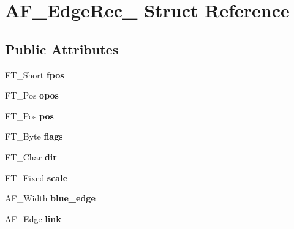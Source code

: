 \hypertarget{struct_a_f___edge_rec__}{}\section{A\+F\+\_\+\+Edge\+Rec\+\_\+ Struct Reference}
\label{struct_a_f___edge_rec__}
\subsection*{Public Attributes}
\begin{DoxyCompactItemize}
\item 
\mbox{\label{struct_a_f___edge_rec___a7890171d1e3f1fbd44b2ab7196594d46}} 
F\+T\+\_\+\+Short {\bfseries fpos}
\item 
\mbox{\label{struct_a_f___edge_rec___a8c44f0a3e4aa3254b0dd5777ad3a997b}} 
F\+T\+\_\+\+Pos {\bfseries opos}
\item 
\mbox{\label{struct_a_f___edge_rec___a2b8e96f147dcff3bcf0bcdfff6924256}} 
F\+T\+\_\+\+Pos {\bfseries pos}
\item 
\mbox{\label{struct_a_f___edge_rec___aad7515038f97e092e10ff4e84bab74ca}} 
F\+T\+\_\+\+Byte {\bfseries flags}
\item 
\mbox{\label{struct_a_f___edge_rec___a04e72c31f57dd4317b95445cf649c1db}} 
F\+T\+\_\+\+Char {\bfseries dir}
\item 
\mbox{\label{struct_a_f___edge_rec___adbe043461299da1038f8926014502ddf}} 
F\+T\+\_\+\+Fixed {\bfseries scale}
\item 
\mbox{\label{struct_a_f___edge_rec___a160286adea871656eab8db699a77022e}} 
A\+F\+\_\+\+Width {\bfseries blue\+\_\+edge}
\item 
\mbox{\label{struct_a_f___edge_rec___a41f8d4233ca7d53b4233ebbe86dc9869}} 
\hyperlink{struct_a_f___edge_rec__}{A\+F\+\_\+\+Edge} {\bfseries link}
\item 
\mbox{\label{struct_a_f___edge_rec___a12d7731f9283877723fc7a2d9c40d937}} 

\end{DoxyCompactItemize}
